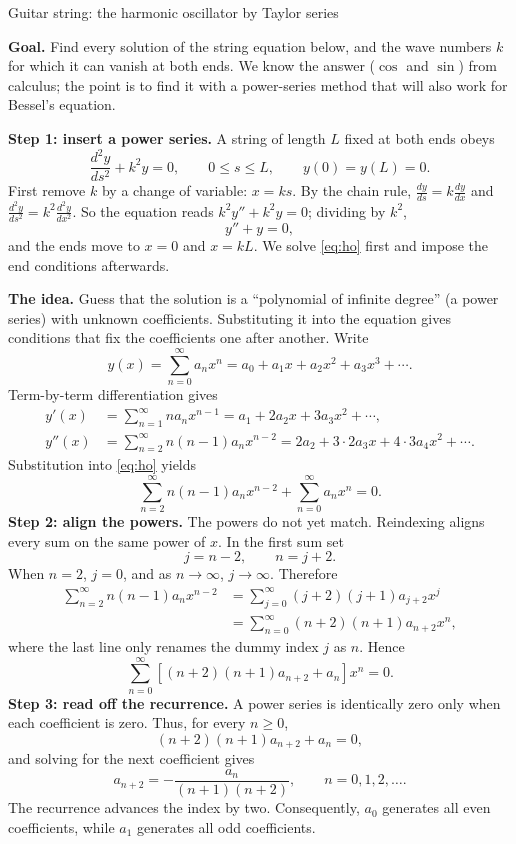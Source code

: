 \documentclass[11pt]{beamer}
\begin{document}
\begin{frame}[allowframebreaks=1.00]{Guitar string: the harmonic oscillator by Taylor series}
\footnotesize

\textbf{Goal.} Find every solution of the string equation below, and the wave numbers $k$ for
which it can vanish at both ends. We know the answer ($\cos$ and $\sin$) from calculus; the point
is to find it with a power-series method that will also work for Bessel's equation.

\textbf{Step 1: insert a power series.}  A string of length $L$ fixed at both ends obeys
\[
 \frac{d^2y}{ds^2}+k^2y=0,\qquad 0\le s\le L,\qquad y(0)=y(L)=0.
\]
First remove \(k\) by a change of variable: \(x=ks\). By the chain rule, \(\frac{dy}{ds}=k\frac{dy}{dx}\) and
\(\frac{d^2y}{ds^2}=k^2\frac{d^2y}{dx^2}\). So the equation reads \(k^2y''+k^2y=0\); dividing by \(k^2\),
\begin{equation}
  y''+y=0,
  \label{eq:ho}
\end{equation}
and the ends move to \(x=0\) and \(x=kL\). We solve \eqref{eq:ho} first and impose the end
conditions afterwards.

\textbf{The idea.} Guess that the solution is a ``polynomial of infinite degree'' (a power series)
with unknown coefficients. Substituting it into the equation gives conditions that fix the
coefficients one after another. Write
\[
  y(x)=\sum_{n=0}^{\infty}a_nx^n
      =a_0+a_1x+a_2x^2+a_3x^3+\cdots.
\]
Term-by-term differentiation gives
\[
\begin{aligned}
  y'(x)
    &=\sum_{n=1}^{\infty}n a_nx^{n-1}
      =a_1+2a_2x+3a_3x^2+\cdots,\\
  y''(x)
    &=\sum_{n=2}^{\infty}n(n-1)a_nx^{n-2}
      =2a_2+3\cdot2a_3x+4\cdot3a_4x^2+\cdots.
\end{aligned}
\]
Substitution into \eqref{eq:ho} yields
\[
  \sum_{n=2}^{\infty}n(n-1)a_nx^{n-2}
  +\sum_{n=0}^{\infty}a_nx^n=0.
\]
\textbf{Step 2: align the powers.}  The powers do not yet match.  Reindexing aligns every
sum on the same power of $x$.  In the first sum set
\[
  j=n-2,
  \qquad n=j+2.
\]
When $n=2$, $j=0$, and as $n\to\infty$, $j\to\infty$.  Therefore
\[
\begin{aligned}
  \sum_{n=2}^{\infty}n(n-1)a_nx^{n-2}
    &=\sum_{j=0}^{\infty}(j+2)(j+1)a_{j+2}x^j\\
    &=\sum_{n=0}^{\infty}(n+2)(n+1)a_{n+2}x^n,
\end{aligned}
\]
where the last line only renames the dummy index $j$ as $n$.  Hence
\[
  \sum_{n=0}^{\infty}
  \left[(n+2)(n+1)a_{n+2}+a_n\right]x^n=0.
\]
\textbf{Step 3: read off the recurrence.}  A power series is identically zero only when each coefficient is zero.  Thus, for every
$n\ge0$,
\[
  (n+2)(n+1)a_{n+2}+a_n=0,
\]
and solving for the next coefficient gives
\begin{equation}
  a_{n+2}=-\frac{a_n}{(n+1)(n+2)},
  \qquad n=0,1,2,\ldots.
  \label{eq:ho-rec}
\end{equation}
The recurrence advances the index by two.  Consequently, $a_0$ generates all even
coefficients, while $a_1$ generates all odd coefficients.
\end{frame}
\end{document}

